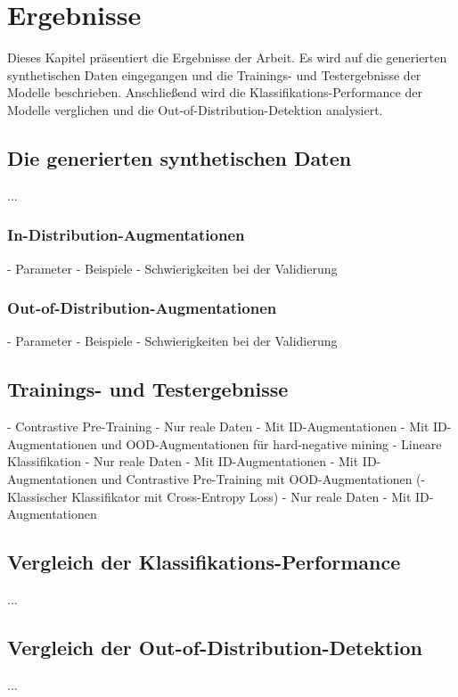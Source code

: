 \chapter{Ergebnisse}

Dieses Kapitel präsentiert die Ergebnisse der Arbeit. Es wird auf die generierten synthetischen Daten eingegangen und die Trainings- und Testergebnisse der Modelle beschrieben. Anschließend wird die Klassifikations-Performance der Modelle verglichen und die Out-of-Distribution-Detektion analysiert.

\section{Die generierten synthetischen Daten}

...

\subsection{In-Distribution-Augmentationen}

- Parameter
- Beispiele
- Schwierigkeiten bei der Validierung

\subsection{Out-of-Distribution-Augmentationen}

- Parameter
- Beispiele
- Schwierigkeiten bei der Validierung

\section{Trainings- und Testergebnisse}

- Contrastive Pre-Training
    - Nur reale Daten
    - Mit ID-Augmentationen
    - Mit ID-Augmentationen und OOD-Augmentationen für hard-negative mining
- Lineare Klassifikation
    - Nur reale Daten
    - Mit ID-Augmentationen
    - Mit ID-Augmentationen und Contrastive Pre-Training mit OOD-Augmentationen
(- Klassischer Klassifikator mit Cross-Entropy Loss)
    - Nur reale Daten
    - Mit ID-Augmentationen

\section{Vergleich der Klassifikations-Performance}

...

\section{Vergleich der Out-of-Distribution-Detektion}

...